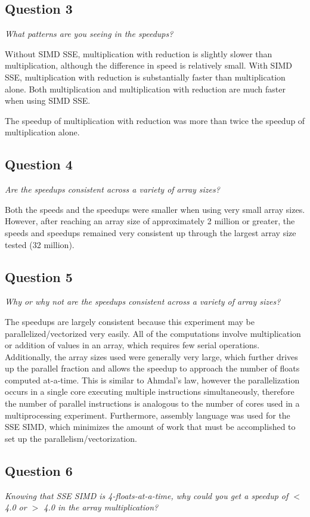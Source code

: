 \documentclass{article}
\begin{document}
\newpage
\subsection*{Question 3}
\textit{What patterns are you seeing in the speedups?}

Without SIMD SSE, multiplication with reduction is slightly slower than multiplication, although the difference in speed is relatively small.  With SIMD SSE, multiplication with reduction is substantially faster than multiplication alone.  Both multiplication and multiplication with reduction are much faster when using SIMD SSE.

The speedup of multiplication with reduction was more than twice the speedup of multiplication alone.

\subsection*{Question 4}
\textit{Are the speedups consistent across a variety of array sizes?}

Both the speeds and the speedups were smaller when using very small array sizes.  However, after reaching an array size of approximately 2 million or greater, the speeds and speedups remained very consistent up through the largest array size tested (32 million).

\subsection*{Question 5}
\textit{Why or why not are the speedups consistent across a variety of array sizes?}

The speedups are largely consistent because this experiment may be parallelized/vectorized very easily.  All of the computations involve multiplication or addition of values in an array, which requires few serial operations.  Additionally, the array sizes used were generally very large, which further drives up the parallel fraction and allows the speedup to approach the number of floats computed at-a-time.  This is similar to Ahmdal's law, however the parallelization occurs in a single core executing multiple instructions simultaneously, therefore the number of parallel instructions is analogous to the number of cores used in a multiprocessing experiment.  Furthermore, assembly language was used for the SSE SIMD, which minimizes the amount of work that must be accomplished to set up the parallelism/vectorization.

\subsection*{Question 6}
\textit{Knowing that SSE SIMD is 4-floats-at-a-time, why could you get a speedup of $<$ 4.0 or $>$ 4.0 in the array multiplication?}
\end{document}

